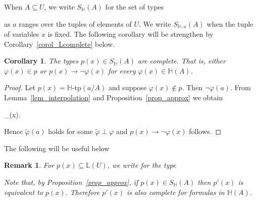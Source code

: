\documentclass[11pt,oneside]{amsart}
\theoremstyle{plain}
\newtheorem{corollary}[theorem]{Corollary}
\newtheorem{remark}[theorem]{Remark}
\theoremstyle{remark}
\renewcommand*{\emph}[1]{%
   \smash{\tikz[baseline]\node[rectangle, fill=olive!25, rounded corners, inner xsep=0.5ex, inner ysep=0.2ex, anchor=base, minimum height = 2.7ex]{#1};}}
\begin{document}




When $A\subseteq U$, we write $S_\mathds{H}(A)$ for the set of types 


 as $a$ ranges over the tuples of elements of $U$.
 We write  $S_{\mathds{H},x}(A)$ when the tuple of variables $x$ is fixed.
 The following corollary will be strengthen by Corollary~\ref{corol_Lcomplete} below.

 \begin{corollary}\label{corol_Hcomplete2}
   The types $p(x)\in S_\mathds{H}(A)$ are complete.
   That is, either $\varphi(x)\in p$ or $p(x)\rightarrow\neg\varphi(x)$ for every $\varphi(x)\in\mathds{H}(A)$.
 \end{corollary}

 \begin{proof}
  Let $p(x)=\mathds{H}\mbox{-tp}(a/A)$ and suppose $\varphi(x)\notin p$.
  Then $\neg\varphi(a)$.
  From Lemma~\ref{lem_interpolation} and Proposition~\ref{prop_approx} we obtain

  {\rightarrow}
  {\bigvee_{\tilde{\varphi}\perp\varphi}\tilde{\varphi}(x).}

  Hence $\tilde{\varphi}(a)$ holds for some $\tilde{\varphi}\perp\varphi$ and $p(x)\rightarrow\neg\varphi(x)$ follows.
 \end{proof}

 The following will be useful below

 \begin{remark}
  For $p(x)\subseteq\mathds{L}(U)$, we write \emph{$p'(x)$\/} for the type


  Note that, by Proposition~\ref{prop_approx}, if $p(x)\in S_{\mathds{H}}(A)$ then $p'(x)$ is equivalent to $p(x)$.
  Therefore $p'(x)$ is also complete for formulas in $\mathds{H}(A)$.\hfill\qedsymbol
 \end{remark}
\end{document}

